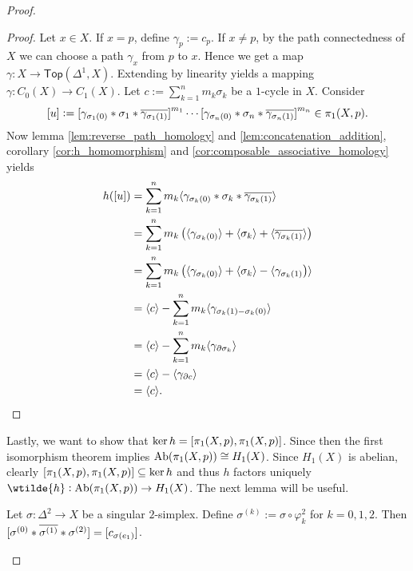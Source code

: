 \begin{proof}
	\begin{proof}
		Let $x \in X$. If $x = p$, define $\gamma_p := c_p$. If $x \neq p$, by the path connectedness of $X$ we can choose a path $\gamma_x$ from $p$ to $x$. Hence we get a map $\gamma : X \to \mathsf{Top}(\Delta^1,X)$. Extending by linearity yields a mapping $\gamma : C_0(X) \to C_1(X)$. Let $c := \sum_{k = 1}^n m_k \sigma_k$ be a $1$-cycle in $X$. Consider
		\begin{equation*}
			\sbr{u} := \sbr[0]{\gamma_{\sigma_1(0)} \ast \sigma_1 \ast \overline{\gamma_{\sigma_1(1)}}}^{m_1} \cdots \sbr[0]{\gamma_{\sigma_n(0)} \ast \sigma_n \ast \overline{\gamma_{\sigma_n(1)}}}^{m_n} \in \pi_1(X,p). 
		\end{equation*}
		Now lemma \ref{lem:reverse_path_homology} and \ref{lem:concatenation_addition}, corollary \ref{cor:h_homomorphism} and \ref{cor:composable_associative_homology} yields
		\begin{align*}
			h(\sbr{u}) &= \sum_{k = 1}^n m_k \langle\gamma_{\sigma_k(0)} \ast \sigma_k \ast \overline{\gamma_{\sigma_k(1)}}\rangle\\
			&= \sum_{k = 1}^n m_k \del[1]{\langle\gamma_{\sigma_k(0)}\rangle + \langle\sigma_k\rangle + \langle \overline{\gamma_{\sigma_k(1)}}\rangle}\\
			&= \sum_{k = 1}^n m_k \del[1]{\langle\gamma_{\sigma_k(0)}\rangle + \langle\sigma_k\rangle - \langle \gamma_{\sigma_k(1)}}\rangle\\
			&= \langle c \rangle - \sum_{k = 1}^n m_k \langle \gamma_{\sigma_k(1) - \sigma_k(0)}\rangle\\
			&= \langle c \rangle - \sum_{k = 1}^n m_k \langle \gamma_{\partial \sigma_k}\rangle\\
			&= \langle c \rangle - \langle \gamma_{\partial c}\rangle\\
			&= \langle c \rangle.
		\end{align*}
	\end{proof}

	Lastly, we want to show that $\ker h = \sbr[0]{\pi_1(X,p),\pi_1(X,p)}$. Since then the first isomorphism theorem implies $\operatorname{Ab}(\pi_1(X,p)) \cong H_1(X)$. Since $H_1(X)$ is abelian, clearly $\sbr[0]{\pi_1(X,p),\pi_1(X,p)} \subseteq \ker h$ and thus $h$ factors uniquely $\wtilde{h} : \Ab(\pi_1(X,p)) \to H_1(X)$. The next lemma will be useful.
	
	\begin{lemma}
		\label{lem:nullhomotopic_loop}
		Let $\sigma : \Delta^2 \to X$ be a singular $2$-simplex. Define $\sigma^{(k)} := \sigma \circ \varphi^2_k$ for $k = 0,1,2$. Then $\sbr[0]{\sigma^{(0)} \ast \overline{\sigma^{(1)}} \ast \sigma^{(2)}} = \sbr[0]{c_{\sigma(e_1)}}$.
	\end{lemma}


\end{proof}

